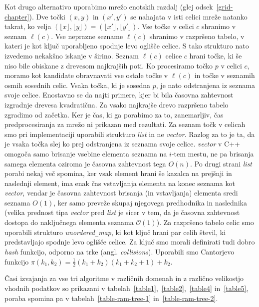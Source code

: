 \documentclass[a4paper, 12pt]{book}
\newcommand{\OO}{\ensuremath{\mathcal{O}}} %
\newcommand{\U}{\texttt{\_}}
\begin{document}
Kot drugo alternativo uporabimo mrežo enotskih razdalj (glej odsek~\ref{grid-chapter}). Dve točki $(x,y)$ in $(x',y')$ se nahajata v isti celici mreže natanko takrat, ko velja $(\lfloor x\rfloor ,\lfloor y\rfloor)=(\lfloor x'\rfloor ,\lfloor y'\rfloor)$. Vse točke v celici $c$ shranimo v seznam $\ell(c)$. Vse neprazne sezname $\ell(c)$ shranimo v razpršeno tabelo, v kateri je kot ključ uporabljeno spodnje levo oglišče celice. S tako strukturo nato izvedemo nekakšno iskanje v širino. Seznam $\ell(c)$ celice $c$ hrani točke, ki še niso bile obiskane z drevesom najkrajših poti. Ko procesiramo točko $p$ v celici $c$, moramo kot kandidate obravnavati vse ostale točke v $\ell(c)$ in točke v seznamih osmih sosednih celic. Vsaka točka, ki je sosedna $p$, je nato odstranjena iz seznama svoje celice. Enostavno se da najti primere, kjer bi bila časovna zahtevnost izgradnje drevesa kvadratična. Za vsako najkrajše drevo razpršeno tabelo zgradimo od začetka. Ker je čas, ki ga porabimo za to, zanemarljiv, čas predprocesiranja za mrežo ni prikazan med rezultati. Za seznam točk v celicah smo pri implementaciji uporabili strukturo \textit{list} in ne \textit{vector}. Razlog za to je ta, da je vsaka točka slej ko prej odstranjena iz seznama svoje celice. \textit{vector} v C++ omogoča samo brisanje vsebine elementa seznama na $i$-tem mestu, ne pa brisanja samega elementa oziroma je časovna zahtevnost tega $O(n)$. Po drugi strani \textit{list} porabi nekaj več spomina, ker vsak element hrani še kazalca na prejšnji in naslednji element, ima enak čas vstavljanja elementa na konec seznama kot \textit{vector}, vendar je časovna zahtevnost brisanja (in vstavljanja) elementa sredi seznama $O(1)$, ker samo preveže skupaj njegovega predhodnika in naslednika (velika prednost tipa \textit{vector} pred \textit{list} je sicer v tem, da je časovna zahtevnost dostopa do naključnega elementa seznama $\OO(1)$). Za razpršeno tabelo celic smo uporabili strukturo \textit{unordered\U map}, ki kot ključ hrani par celih števil, ki predstavljajo spodnje levo oglišče celice. Za ključ smo morali definirati tudi dobro \textit{hash} funkcijo, odporno na trke (angl. \textit{collisions}). Uporabili smo Cantorjevo funkcijo $\pi (k_1, k_2) = \frac{1}{2}(k_1+k_2)(k_1+k_2+1) + k_2$.

Časi izvajanja za vse tri algoritme v različnih domenah in z različno velikostjo vhodnih podatkov so prikazani v tabelah~\ref{table1},~\ref{table2},~\ref{table4} in~\ref{table5}, poraba spomina pa v tabelah~\ref{table-ram-tree-1} in~\ref{table-ram-tree-2}.
\end{document}
